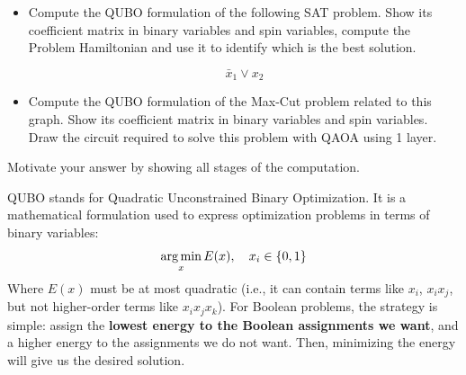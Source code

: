 \noindent
{}
{}
\eexercise[QUBO]
\begin{itemize}
    \item Compute the QUBO formulation of the following SAT problem. Show its coefficient matrix in binary variables and spin variables, compute the Problem Hamiltonian and use it to identify which is the best solution.

        \begin{equation*}
            \bar{x}_1 \vee x_2
        \end{equation*}

    \item Compute the QUBO formulation of the Max-Cut problem related to this graph. Show its coefficient matrix in binary variables and spin variables. Draw the circuit required to solve this problem with QAOA using 1 layer.

        \begin{center}
        \end{center}
\end{itemize}
Motivate your answer by showing all stages of the computation.

{}
\highspace
{}

\begin{deepeningbox}
    QUBO stands for Quadratic Unconstrained Binary Optimization. It is a mathematical formulation used to express optimization problems in terms of binary variables:
    \begin{equation*}
        \operatorname*{arg\,min}_{x} E(x), \quad x_i \in \{0,1\}
    \end{equation*}
    Where $E(x)$ must be at most quadratic (i.e., it can contain terms like $x_i$, $x_i x_j$, but not higher-order terms like $x_i x_j x_k$). For Boolean problems, the strategy is simple: assign the \textbf{lowest energy to the Boolean assignments we want}, and a higher energy to the assignments we do not want. Then, minimizing the energy will give us the desired solution.
\end{deepeningbox}

